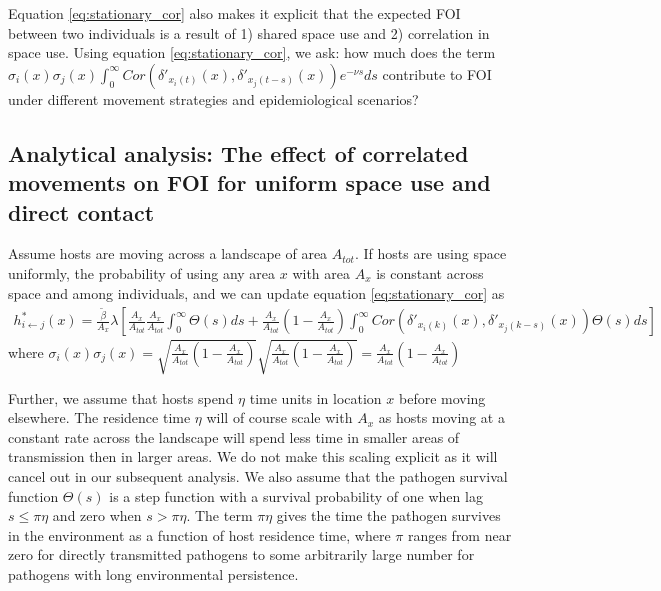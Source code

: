 \documentclass[letterpaper]{article}
\begin{document}
Equation \ref{eq:stationary_cor} also makes it explicit that the expected FOI between two individuals is a result of 1) shared space use and 2) correlation in space use. Using equation \ref{eq:stationary_cor}, we ask: how much does the term $\sigma_i(x) \sigma_j(x) \int_{0}^{\infty} Cor(\delta'_{x_i(t)}(x), \delta'_{x_j(t - s)}(x)) e^{-\nu s} ds$ contribute to FOI under different movement strategies and epidemiological scenarios?

\subsection*{Analytical analysis: The effect of correlated movements on FOI for uniform space use and direct contact}

Assume hosts are moving across a landscape of area $A_{tot}$. %
If hosts are using space uniformly, the probability of using any area $x$ with area $A_x$ is constant across space and among individuals, and we can update equation \ref{eq:stationary_cor} as
\begin{equation}
    \begin{aligned}
    h^*_{i \leftarrow j}(x) = \frac{\tilde\beta}{A_x} \lambda \left[ \frac{A_x}{A_{tot}}\frac{A_x}{A_{tot}} \int_{0}^{\infty} \Theta(s) ds + \frac{A_x}{A_{tot}} \left(1 - \frac{A_x}{A_{tot}}\right) \int_{0}^{\infty} Cor(\delta'_{x_i(k)}(x), \delta'_{x_j(k - s)}(x)) \Theta(s) ds\right]
    \end{aligned}
    \label{eq:stationary_uniform}
\end{equation}
where  $\sigma_i(x) \sigma_j(x) = \sqrt{\frac{A_x}{A_{tot}}(1 - \frac{A_x}{A_{tot}})}\sqrt{\frac{A_x}{A_{tot}}(1 - \frac{A_x}{A_{tot}})} = \frac{A_x}{A_{tot}}(1 - \frac{A_x}{A_{tot}})$

Further, we assume that hosts spend $\eta$ time units in location $x$ before moving elsewhere.  The residence time $\eta$ will of course scale with $A_x$ as hosts moving at a constant rate across the landscape will spend less time in smaller areas of transmission then in larger areas.  We do not make this scaling explicit as it will cancel out in our subsequent analysis. We also assume that the pathogen survival function $\Theta(s)$ is a step function with a survival probability of one when lag $s \leq \pi \eta$ and zero when $s > \pi \eta$. 
The term $\pi \eta$ gives the time the pathogen survives in the environment as a function of host residence time, where $\pi$ ranges from near zero for directly transmitted pathogens to some arbitrarily large number for pathogens with long environmental persistence.  
\end{document}
